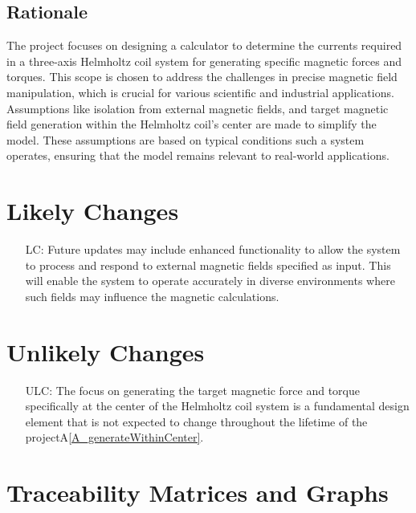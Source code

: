 \documentclass[12pt]{article}
\newcommand{\aref}[1]{A\ref{#1}}
\newcounter{lcnum} %
\newcounter{ulcnum} %
\begin{document}
\subsection{Rationale}
{
The project focuses on designing a calculator to determine the currents required in a three-axis Helmholtz coil system for generating specific magnetic forces and torques. This scope is chosen to address the challenges in precise magnetic field manipulation, which is crucial for various scientific and industrial applications. Assumptions like isolation from external magnetic fields, and target magnetic field generation within the Helmholtz coil's center are made to simplify the model. These assumptions are based on typical conditions such a system operates, ensuring that the model remains relevant to real-world applications.
}
\section{Likely Changes}    

\noindent \begin{itemize}

\item[LC\refstepcounter{lcnum}\thelcnum\label{LC_meaningfulLabel}:] {Future updates may include enhanced functionality to allow the system to process and respond to external magnetic fields specified as input. This will enable the system to operate accurately in diverse environments where such fields may influence the magnetic calculations.}

\end{itemize}

\section{Unlikely Changes}    

\noindent \begin{itemize}

\item[ULC\refstepcounter{ulcnum}\theulcnum\label{ULC_meaningfulLabel}:] {The focus on generating the target magnetic force and torque specifically at the center of the Helmholtz coil system is a fundamental design element that is not expected to change throughout the lifetime of the project\aref{A_generateWithinCenter}.}

\end{itemize}

\section{Traceability Matrices and Graphs}
\end{document}
